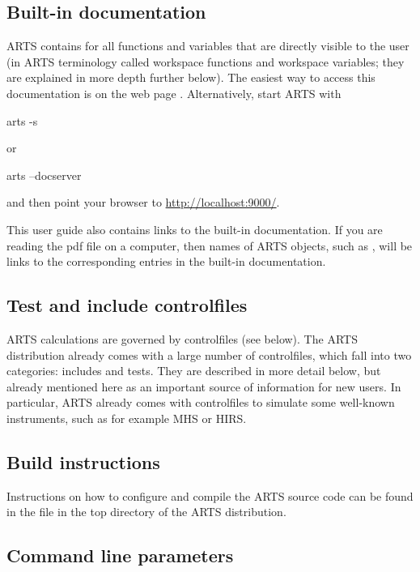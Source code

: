 \subsection{Built-in documentation}
\label{sec:built-in_doc}

ARTS contains  for all functions and
variables that are directly visible to the user (in ARTS terminology called
workspace functions and workspace variables; they are explained in more depth
further below).
The easiest way to access this documentation is on the web page
. Alternatively, start ARTS with
\begin{code}
  arts -s
\end{code}
or
\begin{code}
  arts --docserver
\end{code}
and then point your browser to \url{http://localhost:9000/}.

This user guide also contains links to the built-in
documentation.  If you are reading the pdf file on a computer, then
names of ARTS objects, such as , will be links to
the corresponding entries in the built-in documentation. 

\subsection{Test and include controlfiles}

ARTS calculations are governed by controlfiles (see below). The ARTS
distribution already comes with a large number of controlfiles, which fall into
two categories: includes and tests. They are described in more detail below,
but already mentioned here as an important source of information for new users.
In particular, ARTS already comes with controlfiles to simulate some well-known
instruments, such as for example MHS or HIRS. \\

\subsection{Build instructions}

Instructions on how to configure and compile the ARTS source code can
be found in the file  in the top directory of the
ARTS distribution.

\subsection{Command line parameters}

